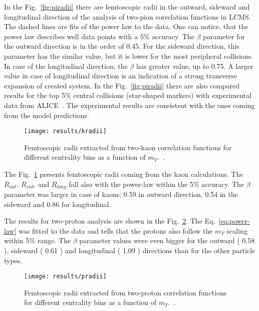       In the Fig.~\ref{fig:piradii} there are femtoscopic radii in the outward, sideward and longitudinal direction of the analysis of two-pion correlation functions in LCMS.
      The dashed lines are fits of the power law to the data.
      One can notice, that the power law describes well data points with a 5\% accuracy.
      The $\beta$ parameter for the outward direction is in the order of 0.45.
      For the sideward direction, this parameter has the similar value, but it is lower for the most peripheral collisions.
      In case of the longitudinal direction, the $\beta$ has greater value, up to 0.75.
      A larger value in case of longitudinal direction is an indication of a strong transverse expansion of created system.
      In the Fig.~\ref{fig:piradii} there are also compared results for the top 5\% central collisions (star-shaped markers) with experimental data from ALICE~\cite{alice_pion}.
      The experimental results are consistent with the ones coming from the model predictions.
      \begin{figure}[b]
        \centering
        \centerline{\texttt{[image: results/kradii]}}
        \caption{Femtoscopic radii extracted from two-kaon correlation functions for different centrality bins as a function of $m_T$.~\cite{galazyn}.}
      \label{fig:kradii}
      \end{figure}

      The Fig.~\ref{fig:kradii} presents femtoscopic radii coming from the kaon calculations.
      The $R_{out}$, $R_{side}$ and $R_{long}$ fall also with the power-law within the 5\% accuracy.
      The $\beta$ parameter was larger in case of kaons: 0.59 in outward direction, 0.54 in the sideward and 0.86 for longitudinal.

      The results for two-proton analysis are shown in the Fig.~\ref{fig:pradii}.
      The Eq.~\ref{eq:power-law} was fitted to the data and tells that the protons also follow the $m_T$ scaling within 5\% range.
      The $\beta$ parameter values were even bigger for the outward ( 0.58 ), sideward ( 0.61 ) and longitudinal ( 1.09 ) directions than for the other particle types. 

      \begin{figure}[b]
        \centering
        \centerline{\texttt{[image: results/pradii]}}
        \caption{Femtoscopic radii extracted from two-proton correlation functions for different centrality bins as a function of $m_T$.~\cite{galazyn}.}
      \label{fig:pradii}
      \end{figure}


